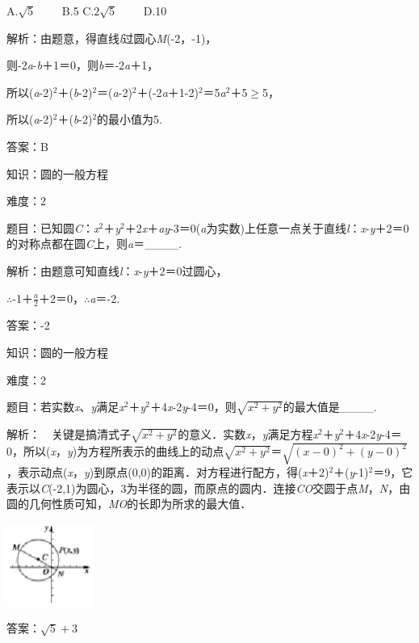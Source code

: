 \documentclass{article} %
\begin{document}
A.$\sqrt{5}$　　 B.5   C.$2\sqrt{5}$　　 D.10

解析：由题意，得直线\textit{l}过圆心\textit{M}(-2，-1)，

则-2\textit{a}-\textit{b}＋1＝0，则\textit{b}＝-2\textit{a}＋1，

所以(\textit{a}-2)${}^{2}$＋(\textit{b}-2)${}^{2}$＝(\textit{a}-2)${}^{2}$＋(-2\textit{a}＋1-2)${}^{2}$＝5\textit{a}${}^{2}$＋5$\mathrm{\ge}$5，

所以(\textit{a}-2)${}^{2}$＋(\textit{b}-2)${}^{2}$的最小值为5.

答案：B

知识：圆的一般方程

难度：2

题目：已知圆\textit{C}：\textit{x}${}^{2}$＋\textit{y}${}^{2}$＋2\textit{x}＋\textit{ay}-3＝0(\textit{a}为实数)上任意一点关于直线\textit{l}：\textit{x}-\textit{y}＋2＝0的对称点都在圆\textit{C}上，则\textit{a}＝\_\_\_\_.

解析：由题意可知直线\textit{l}：\textit{x}-\textit{y}＋2＝0过圆心，

$\mathrm{\therefore}$-1＋$\frac{a}{2}$＋2＝0，$\mathrm{\therefore}$\textit{a}＝-2.

答案：-2

知识：圆的一般方程

难度：2

题目：若实数\textit{x}、\textit{y}满足\textit{x}${}^{2}$＋\textit{y}${}^{2}$＋4\textit{x}-2\textit{y}-4＝0，则$\sqrt{x^2+y^2}$的最大值是\_\_\_\_.

解析：　关键是搞清式子$\sqrt{x^2+y^2}$的意义．实数\textit{x}，\textit{y}满足方程\textit{x}${}^{2}$＋\textit{y}${}^{2}$＋4\textit{x}-2\textit{y}-4＝0，所以(\textit{x}，\textit{y})为方程所表示的曲线上的动点$\sqrt{x^2+y^2}$＝$\sqrt{(x-0)^2+(y-0)^2}$，表示动点(\textit{x}，\textit{y})到原点(0,0)的距离．对方程进行配方，得(\textit{x}＋2)${}^{2}$＋(\textit{y}-1)${}^{2}$＝9，它表示以\textit{C}(-2,1)为圆心，3为半径的圆，而原点的圆内．连接\textit{CO}交圆于点\textit{M}，\textit{N}，由圆的几何性质可知，\textit{MO}的长即为所求的最大值．

\includegraphics*[width=1.13in, height=1.06in, keepaspectratio=false]{image291}

答案：$\sqrt{5}+3$
\end{document}
